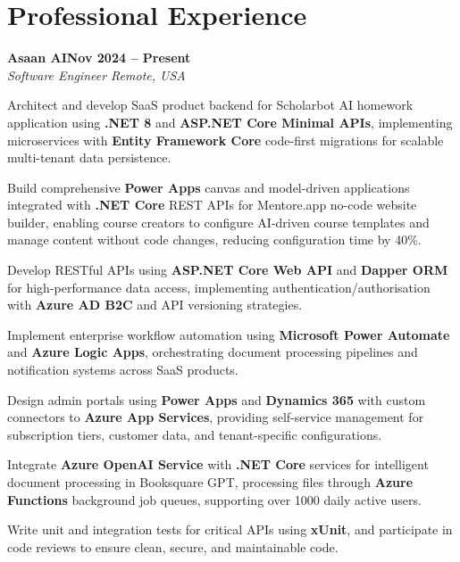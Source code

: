 \documentclass[letterpaper,10pt]{article}
\newcommand{\headingBf}[2]{
  \hspace{10pt}\textbf{#1}\hfill\textbf{#2}\\
}
\newcommand{\headingIt}[2]{
  \hspace{10pt}\textit{#1}\hfill\textit{#2}\\
}
\newenvironment{resume_list}{
  \vspace{-7pt}
  \begin{itemize}[itemsep=-2px, parsep=1pt, leftmargin=30pt]
}{
  \end{itemize}
}
\begin{document}
\section{Professional Experience}

\headingBf{Asaan AI}{Nov 2024 -- Present}
\headingIt{Software Engineer \hfill Remote, USA}{}
\begin{resume_list}
    \item Architect and develop SaaS product backend for Scholarbot AI homework application using \textbf{.NET 8} and \textbf{ASP.NET Core Minimal APIs}, implementing microservices with \textbf{Entity Framework Core} code-first migrations for scalable multi-tenant data persistence.
    \item Build comprehensive \textbf{Power Apps} canvas and model-driven applications integrated with \textbf{.NET Core} REST APIs for Mentore.app no-code website builder, enabling course creators to configure AI-driven course templates and manage content without code changes, reducing configuration time by 40\%.
    \item Develop RESTful APIs using \textbf{ASP.NET Core Web API} and \textbf{Dapper ORM} for high-performance data access, implementing authentication/authorisation with \textbf{Azure AD B2C} and API versioning strategies.
    \item Implement enterprise workflow automation using \textbf{Microsoft Power Automate} and \textbf{Azure Logic Apps}, orchestrating document processing pipelines and notification systems across SaaS products.
    \item Design admin portals using \textbf{Power Apps} and \textbf{Dynamics 365} with custom connectors to \textbf{Azure App Services}, providing self-service management for subscription tiers, customer data, and tenant-specific configurations.
    \item Integrate \textbf{Azure OpenAI Service} with \textbf{.NET Core} services for intelligent document processing in Booksquare GPT, processing files through \textbf{Azure Functions} background job queues, supporting over 1000 daily active users.
    \item Write unit and integration tests for critical APIs using \textbf{xUnit}, and participate in code reviews to ensure clean, secure, and maintainable code.
\end{resume_list}
\end{document}
